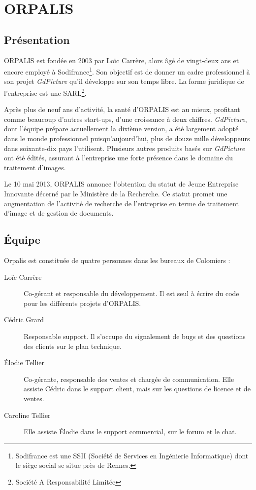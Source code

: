 \chapter{ORPALIS}

\section{Présentation}

ORPALIS est fondée en 2003 par Loïc Carrère, alors âgé de vingt-deux ans et encore employé à Sodifrance\footnote{Sodifrance est une SSII (Société de Services en Ingénierie Informatique) dont le siège social se situe près de Rennes.}. Son objectif est de donner un cadre professionnel à son projet \emph{GdPicture} qu'il développe sur son temps libre. La forme juridique de l'entreprise est une SARL\footnote{Société A Responsabilité Limitée}. 

Après plus de neuf ans d'activité, la santé d'ORPALIS est au mieux, profitant comme beaucoup d'autres start-ups, d'une croissance à deux chiffres. \emph{GdPicture}, dont l'équipe prépare actuellement la dixième version, a été largement adopté dans le monde professionnel puisqu'aujourd'hui, plus de douze mille développeurs dans soixante-dix pays l'utilisent. Plusieurs autres produits basés sur \emph{GdPicture} ont été édités, assurant à l'entreprise une forte présence dans le domaine du traitement d'images.

Le 10 mai 2013, ORPALIS annonce l'obtention du statut de Jeune Entreprise Innovante décerné par le Ministère de la Recherche. Ce statut promet une augmentation de l'activité de recherche de l'entreprise en terme de traitement d'image et de gestion de documents.

\section{Équipe}

Orpalis est constituée de quatre personnes dans les bureaux de Colomiers :

\begin{description}
\item[Loïc Carrère] Co-gérant et responsable du développement. Il est seul à écrire du code pour les différents projets d'ORPALIS. 
\item[Cédric Grard] Responsable support. Il s'occupe du signalement de bugs et des questions des clients sur le plan technique.
\item[\'{E}lodie Tellier] Co-gérante, responsable des ventes et chargée de communication. Elle assiste Cédric dans le support client, mais sur les questions de licence et de ventes.
\item[Caroline Tellier] Elle assiste \'{E}lodie dans le support commercial, sur le forum et le chat.
\end{description}

